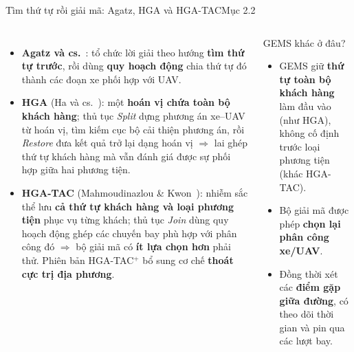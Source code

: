 \documentclass[aspectratio=169,10pt,t,xcolor={table}]{beamer}
\newcommand{\src}[1]{\hfill{\normalfont\footnotesize\color{white!62!navy}#1}}  %
\begin{document}
\begin{frame}{Tìm thứ tự rồi giải mã: Agatz, HGA và HGA-TAC\src{Mục 2.2}}
\begin{columns}[T,onlytextwidth]
\begin{itemize}\footnotesize
\item \textbf{Agatz và cs.}~\cite{agatz2018}: tổ chức lời giải theo hướng \textbf{tìm thứ tự trước}, rồi dùng \textbf{quy hoạch động} chia thứ tự đó thành các đoạn xe phối hợp với UAV.
\item \textbf{HGA} (Ha và cs.~\cite{ha2020}): một \textbf{hoán vị chứa toàn bộ khách hàng}; thủ tục \emph{Split} dựng phương án xe--UAV từ hoán vị, tìm kiếm cục bộ cải thiện phương án, rồi \emph{Restore} đưa kết quả trở lại dạng hoán vị $\Rightarrow$ lai ghép thứ tự khách hàng mà vẫn đánh giá được sự phối hợp giữa hai phương tiện.
\item \textbf{HGA-TAC} (Mahmoudinazlou \& Kwon~\cite{hgatac2024}): nhiễm sắc thể lưu \textbf{cả thứ tự khách hàng và loại phương tiện} phục vụ từng khách; thủ tục \emph{Join} dùng quy hoạch động ghép các chuyến bay phù hợp với phân công đó $\Rightarrow$ bộ giải mã có \textbf{ít lựa chọn hơn} phải thử. Phiên bản HGA-TAC$^+$ bổ sung cơ chế \textbf{thoát cực trị địa phương}.
\end{itemize}
\begin{alertblock}{GEMS khác ở đâu?}
\footnotesize
\begin{itemize}
\item GEMS giữ \textbf{thứ tự toàn bộ khách hàng} làm đầu vào (như HGA), không cố định trước loại phương tiện (khác HGA-TAC).
\item Bộ giải mã được phép \textbf{chọn lại phân công xe/UAV}.
\item Đồng thời xét các \textbf{điểm gặp giữa đường}, có theo dõi thời gian và pin qua các lượt bay.
\end{itemize}
\end{alertblock}
\end{columns}
\end{frame}
\end{document}
